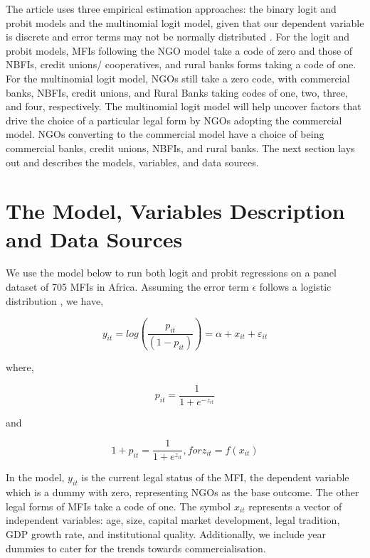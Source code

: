 \documentclass[a4paper,nobind]{templates/ociamthesis}
\begin{document}
The article uses three empirical estimation approaches: the binary logit and probit models and the multinomial logit model, given that our dependent variable is discrete and error terms may not be normally distributed \autocite{cramer2002origins}. For the logit and probit models, MFIs following the NGO model take a code of zero and those of NBFIs, credit unions/ cooperatives, and rural banks forms taking a code of one. For the multinomial logit model, NGOs still take a zero code, with commercial banks, NBFIs, credit unions, and Rural Banks taking codes of one, two, three, and four, respectively. The multinomial logit model will help uncover factors that drive the choice of a particular legal form by NGOs adopting the commercial model. NGOs converting to the commercial model have a choice of being commercial banks, credit unions, NBFIs, and rural banks. The next section lays out and describes the models, variables, and data sources.

\hypertarget{the-model-variables-description-and-data-sources}{%
\section{The Model, Variables Description and Data Sources}\label{the-model-variables-description-and-data-sources}}

We use the model below to run both logit and probit regressions on a panel dataset of 705 MFIs in Africa. Assuming the error term \(\epsilon\) follows a logistic distribution \autocite{czepiel2002maximum}, we have,

\begin{equation}
y_{it} = log(\frac{p_{it}}{(1-p_{it})} ) = \alpha + x_{it} + \varepsilon_{it}
\end{equation}

where,

\begin{equation}
p_{it}  =  \frac{1}{1 +  e^{- z_{it} } } 
\end{equation}

and

\begin{equation}
1 + p_{it}  =  \frac{1}{1 +  e^{z_{it} } }, for z_{it} = f(x_{it})
\end{equation}

In the model, \(y_{it}\) is the current legal status of the MFI, the dependent variable which is a dummy with zero, representing NGOs as the base outcome. The other legal forms of MFIs take a code of one. The symbol \(x_{it}\) represents a vector of independent variables: age, size, capital market development, legal tradition, GDP growth rate, and institutional quality. Additionally, we include year dummies to cater for the trends towards commercialisation.
\end{document}
